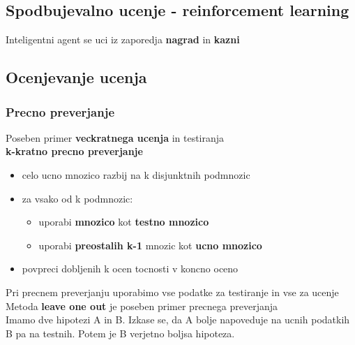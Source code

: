 \subsection{Spodbujevalno ucenje - reinforcement learning}
Inteligentni agent se uci iz zaporedja \textbf{nagrad} in \textbf{kazni}

\subsection{Ocenjevanje ucenja}

\subsubsection{Precno preverjanje}
Poseben primer \textbf{veckratnega ucenja} in testiranja\\
\textbf{k-kratno precno preverjanje}
\begin{itemize}[leftmargin=*,noitemsep,topsep=0pt,partopsep=0pt]
    \item celo ucno mnozico razbij na k disjunktnih podmnozic
    \item za vsako od k podmnozic:
    \begin{itemize}[leftmargin=*,noitemsep,topsep=0pt,partopsep=0pt]
        \item uporabi \textbf{mnozico} kot \textbf{testno mnozico}
        \item uporabi \textbf{preostalih k-1} mnozic kot \textbf{ucno mnozico}
    \end{itemize}
    \item povpreci dobljenih k ocen tocnosti v koncno oceno
\end{itemize}
Pri precnem preverjanju uporabimo vse podatke za testiranje in vse za ucenje\\
Metoda \textbf{leave one out} je poseben primer precnega preverjanja\\
Imamo dve hipotezi A in B. Izkase se, da A bolje napoveduje na ucnih podatkih
B pa na testnih. Potem je B verjetno boljsa hipoteza.
